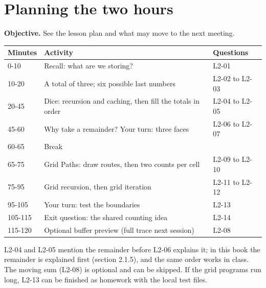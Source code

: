 \documentclass[11pt,a4paper,oneside]{report}
\newcommand{\sectiongoal}[1]{\par{\color{quiet}\textbf{Objective.} #1}\par\smallskip}
\begin{document}
\section{Planning the two hours}
\sectiongoal{See the lesson plan and what may move to the next meeting.}
\par\medskip\begingroup\small\setlength{\tabcolsep}{4pt}\renewcommand{\arraystretch}{1.3}\begin{tabularx}{\linewidth}{>{\raggedright\arraybackslash}p{16mm}>{\raggedright\arraybackslash}X>{\raggedright\arraybackslash}p{26mm}}\toprule\textbf{Minutes} & \textbf{Activity} & \textbf{Questions}\\\midrule
{}0-10 & Recall: what are we storing? & L2-01\\
{}10-20 & A total of three; six possible last numbers & L2-02 to L2-03\\
{}20-45 & Dice: recursion and caching, then fill the totals in order & L2-04 to L2-05\\
{}45-60 & Why take a remainder? Your turn: three faces & L2-06 to L2-07\\
{}60-65 & Break & \\
{}65-75 & Grid Paths: draw routes, then two counts per cell & L2-09 to L2-10\\
{}75-95 & Grid recursion, then grid iteration & L2-11 to L2-12\\
{}95-105 & Your turn: test the boundaries & L2-13\\
{}105-115 & Exit question: the shared counting idea & L2-14\\
{}115-120 & Optional buffer preview (full trace next session) & L2-08\\
\bottomrule\end{tabularx}\endgroup\par\medskip
L2-04 and L2-05 mention the remainder before L2-06 explains it; in this book the remainder is explained first (section 2.1.5), and the same order works in class. The moving sum (L2-08) is optional and can be skipped. If the grid programs run long, L2-13 can be finished as homework with the local test files.
\end{document}
